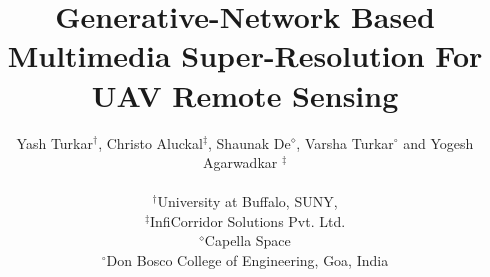 \documentclass[conference]{IEEEtran}
\begin{document}
\title{Generative-Network Based Multimedia Super-Resolution For UAV
Remote Sensing\\
}

\author{
    Yash Turkar$^\dagger$, Christo Aluckal$^\ddagger$, Shaunak De$^\diamond$, Varsha Turkar$^\circ$ and Yogesh Agarwadkar $^\ddagger$\\\\
    $^\dagger$University at Buffalo, SUNY,\\ $^\ddagger$InfiCorridor Solutions Pvt. Ltd.\\ $^\diamond$Capella Space \\ $^\circ$Don Bosco College of Engineering, Goa, India
}

\end{document}
